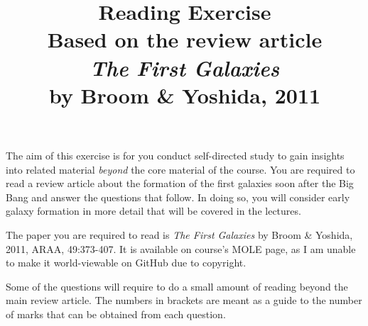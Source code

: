 \documentclass[11pt]{article}
\begin{document}
 
\title{Reading Exercise\\Based on the review article\\
{\it The First Galaxies}\\ by Broom \& Yoshida, 2011}
\maketitle
 
\noindent
The aim of this exercise is for you conduct self-directed study to gain insights into related material {\it beyond} the core material of the course. You are required to read a review article about the formation of the first galaxies soon after the Big Bang and answer the questions that follow. In doing so, you will consider early galaxy formation in more detail that will be covered in the lectures.

\vspace{2mm}
\noindent
The paper you are required to read is {\it The First Galaxies} by Broom \& Yoshida, 2011, ARAA, 49:373-407. It is available on course's MOLE page, as I am unable to make it world-viewable on GitHub due to copyright.

\vspace{2mm}
\noindent
Some of the questions will require to do a small amount of reading beyond the main review article. The numbers in brackets are meant as a guide to the number of marks that can be obtained from each question.
\end{document}
